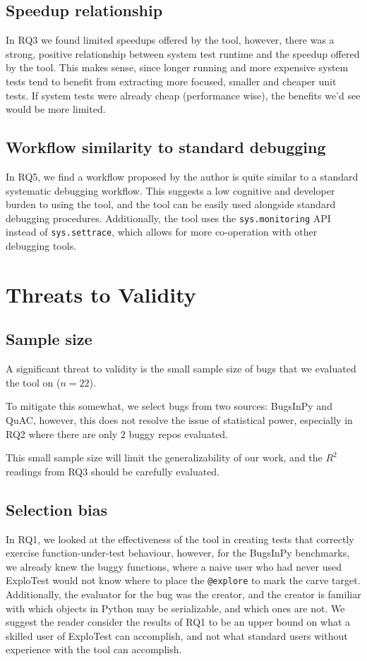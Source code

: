 \subsection{Speedup relationship}
In RQ3 we found limited speedups offered by the tool, however, there was a strong, positive relationship
between system test runtime and the speedup offered by the tool. This makes sense, since longer running and more
expensive system tests tend to benefit from extracting more focused, smaller and cheaper unit tests. If system tests
were already cheap (performance wise), the benefits we'd see would be more limited.

\subsection{Workflow similarity to standard debugging}
In RQ5, we find a workflow proposed by the author is quite similar to a standard systematic debugging workflow.
This suggests a low cognitive and developer burden to using the tool, and the tool can be easily used
alongside standard debugging procedures. Additionally, the tool uses the \verb|sys.monitoring| API instead
of \verb|sys.settrace|, which allows for more co-operation with other debugging tools.
\section{Threats to Validity}

\subsection{Sample size}
A significant threat to validity is the small sample size of bugs that we evaluated the tool on ($n = 22$).

To mitigate this somewhat, we select bugs from two sources: BugsInPy and QuAC, however, this does not
resolve the issue of statistical power, especially in RQ2 where there are only 2 buggy repos evaluated.

This small sample size will limit the generalizability of our work,
and the $R^2$ readings from RQ3 should be carefully evaluated.

\subsection{Selection bias}
In RQ1, we looked at the effectiveness of the tool in creating tests that correctly exercise function-under-test behaviour,
however, for the BugsInPy benchmarks, we already knew the buggy functions, where a naive user who had never used ExploTest
would not know where to place the \verb|@explore| to mark the carve target. Additionally, the evaluator for the bug was the creator,
and the creator is familiar with which objects in Python may be serializable, and which ones are not. We suggest the reader
consider the results of RQ1 to be an upper bound on what a skilled user of ExploTest can accomplish, and not what standard users
without experience with the tool can accomplish.

